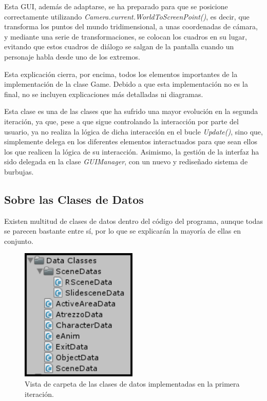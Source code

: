 \begin{itemize}
	Esta GUI, además de adaptarse, se ha preparado para que se posicione correctamente utilizando \textit{Camera.current.WorldToScreenPoint()}, es decir, que transforma los puntos del mundo tridimensional, a unas coordenadas de cámara, y mediante una serie de transformaciones, se colocan los cuadros en su lugar, evitando que estos cuadros de diálogo se salgan de la pantalla cuando un personaje habla desde uno de los extremos.
\end{itemize}

Esta explicación cierra, por encima, todos los elementos importantes de la implementación de la clase Game. Debido a que esta implementación no es la final, no se incluyen explicaciones más detalladas ni diagramas.

Esta clase es una de las clases que ha sufrido una mayor evolución en la segunda iteración, ya que, pese a que sigue controlando la interacción por parte del usuario, ya no realiza la lógica de dicha interacción en el bucle \textit{Update()}, sino que, simplemente delega en los diferentes elementos interactuados para que sean ellos los que realicen la lógica de su interacción. Asimismo, la gestión de la interfaz ha sido delegada en la clase \textit{GUIManager}, con un nuevo y rediseñado sistema de burbujas.

\subsection{Sobre las Clases de Datos}
\label{dataclassesit1}

Existen multitud de clases de datos dentro del código del programa, aunque todas se parecen bastante entre sí, por lo que se explicarán la mayoría de ellas en conjunto.

\begin{figure}[htb]
	\includegraphics[height=2.5in]{figures/it1/dataclasses.png}
	\caption[Clases de Datos - Prototipo 1]{Vista de carpeta de las clases de datos implementadas en la primera iteración.}
	\label{dataclassesfigit1}
\end{figure}

